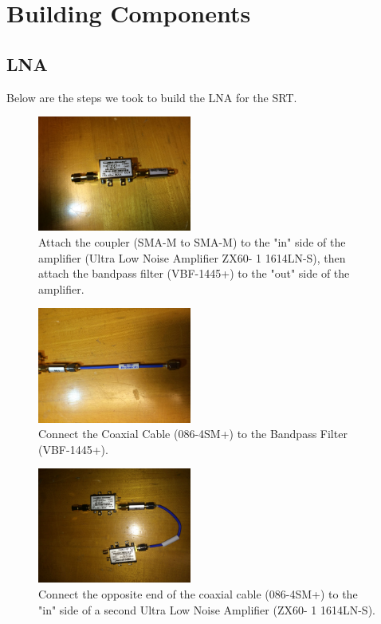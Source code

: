 \documentclass[11pt]{article} %
\begin{document}
\newpage
\section{Building Components}


\subsection{LNA}

Below are the steps we took to build the LNA for the SRT.

\begin{figure}
  \centering
  \caption{Attach the coupler (SMA-M to SMA-M) to the "in" side of the amplifier (Ultra Low Noise Amplifier ZX60- 1 1614LN-S),  then attach the bandpass filter (VBF-1445+) to the "out" side of the amplifier. }
  \includegraphics[width=0.45\textwidth]{lna/01.jpeg}
\end{figure}


\begin{figure}
  \centering
  \caption{Connect the Coaxial Cable (086-4SM+) to the Bandpass Filter (VBF-1445+). }
  \includegraphics[width=0.45\textwidth]{lna/02.jpeg}
\end{figure}


\begin{figure}
  \centering
  \caption{Connect the opposite end of the coaxial cable (086-4SM+) to the "in" side of a second Ultra Low Noise Amplifier (ZX60- 1 1614LN-S).  }
  \includegraphics[width=0.45\textwidth]{lna/03.jpeg}
\end{figure}
\end{document}
